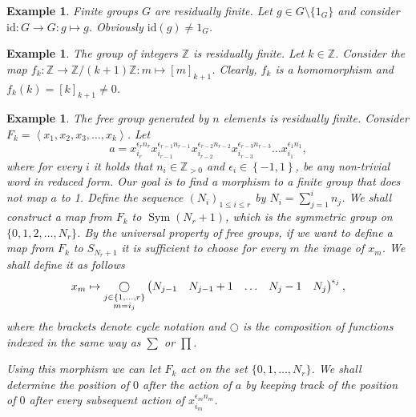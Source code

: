 \documentclass[titlepage, a4paper]{article}
\newcommand{\Z}{\mathbb{Z}}
\newcommand{\id}{\mathrm{id}}
\DeclareMathOperator{\sym}{Sym}
\def\ext{\qopname\relax m{\bigcirc}}
\theoremstyle{theoremdd}
\theoremstyle{definitiondd}
\theoremstyle{remarkdd}
\newtheorem{example}[theorem]{Example}
\begin{document}
\begin{example}
	Finite groups $G$ are residually finite. Let $g \in G \setminus \{1_G\}$ and consider $\id: G \to G: g \mapsto g$. Obviously $\id(g) \neq 1_G$.
\end{example}


\begin{example}
	The group of integers $\mathbb Z$ is residually finite. Let $k \in \mathbb Z$. Consider the map $f_k: \mathbb Z \to \mathbb Z/(k+1)\mathbb Z: m \mapsto [m]_{k+1}$. Clearly, $f_k$ is a homomorphism and $f_k(k) = [k]_{k+1} \neq 0$.
\end{example}

\begin{example}\label{ex:free_group_residually_finite}
	The free group generated by $n$ elements is residually finite. 
	Consider $F_k = \left<x_1, x_2, x_3, \ldots, x_k \right>$.
Let \[
a = x_{i_r}^{\epsilon_r n_r}x_{i_{r-1}}^{\epsilon_{r-1}n_{r-1}}x_{i_{r-2}}^{\epsilon_{r-2}n_{r-2}}x_{i_{r-3}}^{\epsilon_{r-3}n_{r-3}} \ldots x_{i_1}^{\epsilon_1n_1}
,\]
where for every $i$ it holds that $n_i \in \Z_{>0}$ and $\epsilon_i \in \left\{ -1,1 \right\} $, be any non-trivial word in reduced form. 
Our goal is to find a morphism to a finite group that does not map $a$ to 1. 
Define the sequence $(N_i)_{1 \leq i \leq r}$ by $N_i = \sum_{j = 1}^{i} n_j$. 
We shall construct a map from $F_k$ to $\sym(N_r + 1)$, which is the symmetric group on $\{0,1, 2, \ldots, N_{r}\} $.  
By the universal property of free groups, if we want to define a map from $F_k$ to $S_{N_r +1}$ it is sufficient to choose for every $m$ the image of $x_m$.
We shall define it as follows
\[
	x_m \mapsto \ext_{\substack{j \in \{1,\ldots, r\} \\ m = i_j} } \begin{pmatrix} N_{j-1} & N_{j-1} +  1& \ldots & N_{j} -1 & N_{j} \end{pmatrix}^{\epsilon_j}
,\] 
where the brackets denote cycle notation and $\bigcirc$ is the composition of functions indexed in the same way as  $\sum$ or $\prod$.

Using this morphism we can let $F_k$ act on the set $\{0,1,\ldots, N_r\} $. 
We shall determine the position of $0$ after the action of $a$ by keeping track of the position of $0$ after every subsequent  action of  $x_{i_m}^{\epsilon_m n_m}$.


\end{example}
\end{document}
